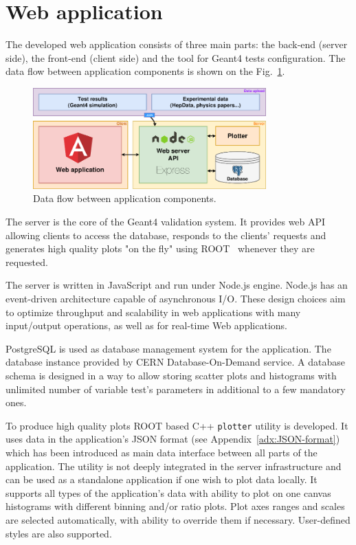 \section{Web application}
\label{sec-webapplication}

The developed web application consists of three main parts: the back-end (server side), the front-end (client side) and the tool 
for Geant4 tests configuration. The data flow between application components is shown on the Fig.~\ref{fig:dataflow}.

\begin{figure}[h]
    \centering
    \includegraphics[width=0.8\textwidth,clip]{schema.png}
    \caption{Data flow between application components.}
    \label{fig:dataflow}
\end{figure}

The server is the core of the Geant4 validation system. It provides web API allowing clients to access the database, responds to the clients' requests and generates high quality plots "on the fly" using ROOT~\cite{ROOT} whenever they are requested.

The server is written in JavaScript and run under Node.js engine. Node.js has an event-driven architecture capable of asynchronous I/O. These design choices aim to optimize throughput and scalability in web applications with many input/output operations, as well as for real-time Web applications.

PostgreSQL is used as database management system for the application. The database instance provided by CERN Database-On-Demand service. A database schema is designed in a way to allow storing scatter plots and histograms with unlimited number of variable test's parameters in additional to a few mandatory ones.

To produce high quality plots ROOT based C++ {\tt plotter} utility is developed. It uses data in the application's JSON format (see Appendix~\ref{adx:JSON-format}) which has been introduced as main data interface between all parts of the application. The utility is not deeply integrated in the server infrastructure and can be used as a standalone application if one wish to plot data locally. It supports all types of the application's data with ability to plot on one canvas histograms with different binning and/or ratio plots. Plot axes ranges and scales are selected automatically, with ability to override them if necessary. User-defined styles are also supported.


